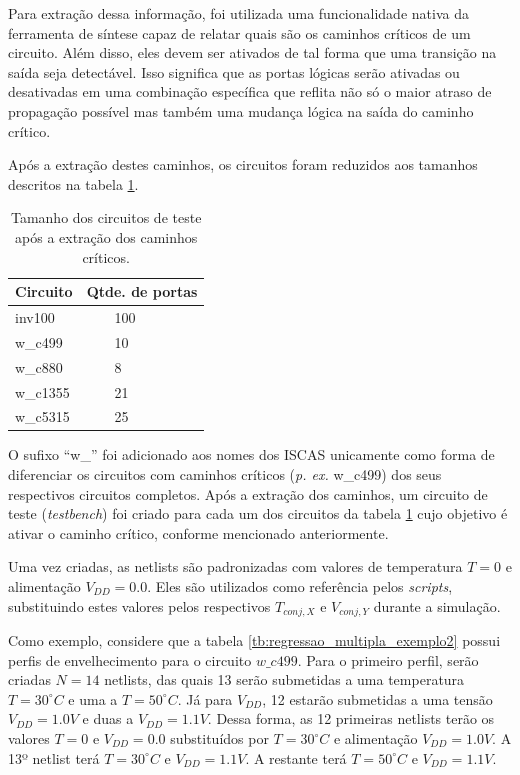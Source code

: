 Para extração dessa informação, foi utilizada uma funcionalidade nativa da ferramenta de síntese capaz de relatar quais são os caminhos críticos de um circuito. Além disso, eles devem ser ativados de tal forma que uma transição na saída seja detectável. Isso significa que as portas lógicas serão ativadas ou desativadas em uma combinação específica que reflita não só o maior atraso de propagação possível mas também uma mudança lógica na saída do caminho crítico.

Após a extração destes caminhos, os circuitos foram reduzidos aos tamanhos descritos na tabela \ref{tb:tamanho_piores_caminhos}.
\begin{table}[H]
	\centering
	\caption{Tamanho dos circuitos de teste após a extração dos caminhos críticos.}
	\begin{tabular}{@{}ll@{}}
		\toprule
		Circuito & Qtde. de portas \\ \midrule
		inv100 & \ \ \ \ 100 \\ \midrule
		w\_c499 & \ \ \ \ 10 \\ \midrule
		w\_c880 & \ \ \ \ 8 \\ \midrule
		w\_c1355 & \ \ \ \ 21 \\ \midrule
		w\_c5315 & \ \ \ \ 25 \\ \bottomrule
	\end{tabular}
	\label{tb:tamanho_piores_caminhos}
\end{table}
O sufixo ``w\_'' foi adicionado aos nomes dos ISCAS unicamente como forma de diferenciar os circuitos com caminhos críticos (\textit{p. ex.} w\_c499) dos seus respectivos circuitos completos. Após a extração dos caminhos, um circuito de teste (\textit{testbench}) foi criado para cada um dos circuitos da tabela \ref{tb:tamanho_piores_caminhos} cujo objetivo é ativar o caminho crítico, conforme mencionado anteriormente.  

Uma vez criadas, as netlists são padronizadas com valores de temperatura $T=0$ e alimentação $V_{DD}=0.0$. Eles são utilizados como referência pelos \textit{scripts}, substituindo estes valores pelos respectivos $T_{conj,X}$ e $V_{conj,Y}$ durante a simulação.

Como exemplo, considere que a tabela \ref{tb:regressao_multipla_exemplo2} possui perfis de envelhecimento para o circuito $w\_c499$. Para o primeiro perfil, serão criadas $N=14$ netlists, das quais 13 serão submetidas a uma temperatura $T=30^{\circ}C$ e uma a $T=50^{\circ}C$. Já para $V_{DD}$, 12 estarão submetidas a uma tensão $V_{DD}=1.0V$ e duas a $V_{DD}=1.1V$. Dessa forma, as 12 primeiras netlists terão os valores $T=0$ e $V_{DD}=0.0$ substituídos por $T=30^{\circ}C$ e alimentação $V_{DD}=1.0V$. A 13º netlist terá $T=30^{\circ}C$ e $V_{DD}=1.1V$. A restante terá $T=50^{\circ}C$ e $V_{DD}=1.1V$.

